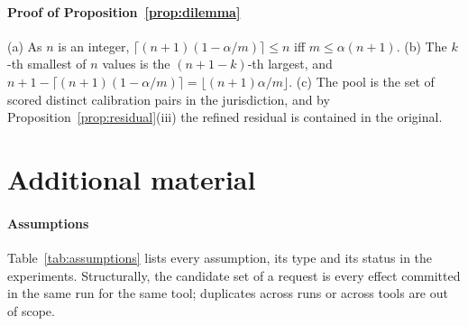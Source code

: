 \paragraph{Proof of Proposition~\ref{prop:dilemma}}
(a) As $n$ is an integer, $\lceil(n+1)(1-\alpha/m)\rceil\le n$ iff $m\le\alpha(n+1)$. (b) The $k$-th smallest of $n$ values is the $(n+1-k)$-th largest, and $n+1-\lceil(n+1)(1-\alpha/m)\rceil=\lfloor(n+1)\alpha/m\rfloor$. (c) The pool is the set of scored distinct calibration pairs in the jurisdiction, and by Proposition~\ref{prop:residual}(iii) the refined residual is contained in the original.






\section{Additional material}\label{app:extra}

\paragraph{Assumptions}
Table~\ref{tab:assumptions} lists every assumption, its type and its status in the experiments. Structurally, the candidate set of a request is every effect committed in the same run for the same tool; duplicates across runs or across tools are out of scope.


